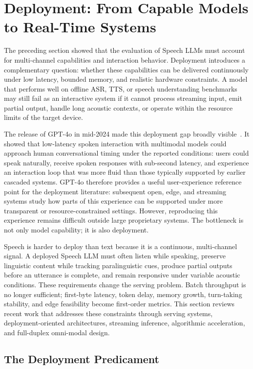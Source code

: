 \section{Deployment: From Capable Models to Real-Time Systems}
\label{sec:deployment}

The preceding section showed that the evaluation of Speech LLMs must account for multi-channel capabilities and interaction behavior. Deployment introduces a complementary question: whether these capabilities can be delivered continuously under low latency, bounded memory, and realistic hardware constraints. A model that performs well on offline ASR, TTS, or speech understanding benchmarks may still fail as an interactive system if it cannot process streaming input, emit partial output, handle long acoustic contexts, or operate within the resource limits of the target device.

The release of GPT-4o in mid-2024 made this deployment gap broadly visible~\citep{openai2024gpt4o}. It showed that low-latency spoken interaction with multimodal models could approach human conversational timing under the reported conditions: users could speak naturally, receive spoken responses with sub-second latency, and experience an interaction loop that was more fluid than those typically supported by earlier cascaded systems. GPT-4o therefore provides a useful user-experience reference point for the deployment literature: subsequent open, edge, and streaming systems study how parts of this experience can be supported under more transparent or resource-constrained settings. However, reproducing this experience remains difficult outside large proprietary systems. The bottleneck is not only model capability; it is also deployment.

Speech is harder to deploy than text because it is a continuous, multi-channel signal. A deployed Speech LLM must often listen while speaking, preserve linguistic content while tracking paralinguistic cues, produce partial outputs before an utterance is complete, and remain responsive under variable acoustic conditions. These requirements change the serving problem. Batch throughput is no longer sufficient; first-byte latency, token delay, memory growth, turn-taking stability, and edge feasibility become first-order metrics. This section reviews recent work that addresses these constraints through serving systems, deployment-oriented architectures, streaming inference, algorithmic acceleration, and full-duplex omni-modal design.

\subsection{The Deployment Predicament}

